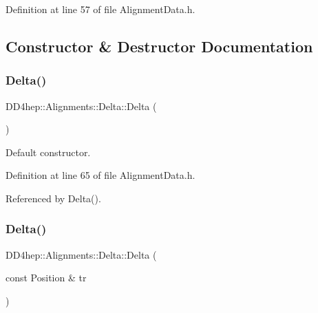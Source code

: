 Definition at line 57 of file Alignment\+Data.\+h.



\subsection{Constructor \& Destructor Documentation}
\hypertarget{class_d_d4hep_1_1_alignments_1_1_delta_a1db2d4fa836434f834b0bd0502bc43d7}{}\label{class_d_d4hep_1_1_alignments_1_1_delta_a1db2d4fa836434f834b0bd0502bc43d7} 
\subsubsection{\texorpdfstring{Delta()}{Delta()}\hspace{0.1cm}{\footnotesize\ttfamily [1/7]}}
{\footnotesize\ttfamily D\+D4hep\+::\+Alignments\+::\+Delta\+::\+Delta (\begin{DoxyParamCaption}{ }\end{DoxyParamCaption})\hspace{0.3cm}{\ttfamily [inline]}}



Default constructor. 



Definition at line 65 of file Alignment\+Data.\+h.



Referenced by Delta().

\hypertarget{class_d_d4hep_1_1_alignments_1_1_delta_a4da265200c1c24051c8861dd7f5d09f2}{}\label{class_d_d4hep_1_1_alignments_1_1_delta_a4da265200c1c24051c8861dd7f5d09f2} 
\subsubsection{\texorpdfstring{Delta()}{Delta()}\hspace{0.1cm}{\footnotesize\ttfamily [2/7]}}
{\footnotesize\ttfamily D\+D4hep\+::\+Alignments\+::\+Delta\+::\+Delta (\begin{DoxyParamCaption}\item[{const Position \&}]{tr }\end{DoxyParamCaption})\hspace{0.3cm}{\ttfamily [inline]}}



